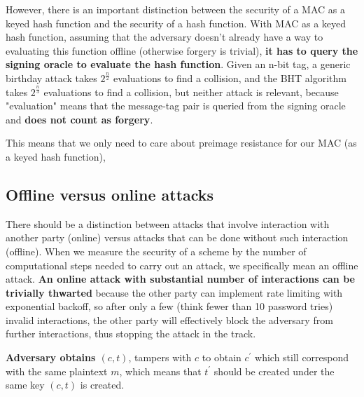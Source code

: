 \documentclass{article}
\begin{document}
However, there is an important distinction between the security of a MAC as a keyed hash function and the security of a hash function. With MAC as a keyed hash function, assuming that the adversary doesn't already have a way to evaluating this function offline (otherwise forgery is trivial), \textbf{it has to query the signing oracle to evaluate the hash function}. Given an n-bit tag, a generic birthday attack takes $2^{\frac{n}{2}}$ evaluations to find a collision, and the BHT algorithm \cite{brassard1997quantum} takes $2^{\frac{n}{3}}$ evaluations to find a collision, but neither attack is relevant, because "evaluation" means that the message-tag pair is queried from the signing oracle and \textbf{does not count as forgery}.

This means that we only need to care about preimage resistance for our MAC (as a keyed hash function), 

\subsection{Offline versus online attacks}
There should be a distinction between attacks that involve interaction with another party (online) versus attacks that can be done without such interaction (offline). When we measure the security of a scheme by the number of computational steps needed to carry out an attack, we specifically mean an offline attack. \textbf{An online attack with substantial number of interactions can be trivially thwarted} because the other party can implement rate limiting with exponential backoff, so after only a few (think fewer than 10 password tries) invalid interactions, the other party will effectively block the adversary from further interactions, thus stopping the attack in the track.

\textbf{Adversary obtains $(c, t)$}, tampers with $c$ to obtain $c^\prime$ which still correspond with the same plaintext $m$, which means that $t^\prime$ should be created under the same key $(c, t)$ is created.



\end{document}
